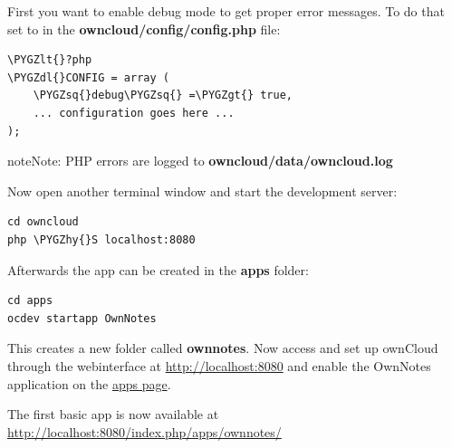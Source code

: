 \documentclass[letterpaper,10pt,english]{sphinxmanual}
\def\PYGZlt{\char`\<}
\def\PYGZgt{\char`\>}
\def\PYGZdl{\char`\$}
\def\PYGZhy{\char`\-}
\def\PYGZsq{\char`\'}
\renewcommand\PYGZsq{\textquotesingle}
\begin{document}
First you want to enable debug mode to get proper error messages. To do that set  to  in the \textbf{owncloud/config/config.php} file:

\begin{Verbatim}[commandchars=\\\{\}]
\PYGZlt{}?php
\PYGZdl{}CONFIG = array (
    \PYGZsq{}debug\PYGZsq{} =\PYGZgt{} true,
    ... configuration goes here ...
);
\end{Verbatim}

\begin{notice}{note}{Note:}
PHP errors are logged to \textbf{owncloud/data/owncloud.log}
\end{notice}

Now open another terminal window and start the development server:

\begin{Verbatim}[commandchars=\\\{\}]
cd owncloud
php \PYGZhy{}S localhost:8080
\end{Verbatim}

Afterwards the app can be created in the \textbf{apps} folder:

\begin{Verbatim}[commandchars=\\\{\}]
cd apps
ocdev startapp OwnNotes
\end{Verbatim}

This creates a new folder called \textbf{ownnotes}. Now access and set up ownCloud through the webinterface at \href{http://localhost:8080}{http://localhost:8080} and enable the OwnNotes application on the \href{http://localhost:8080/index.php/settings/apps}{apps page}.

The first basic app is now available at \href{http://localhost:8080/index.php/apps/ownnotes/}{http://localhost:8080/index.php/apps/ownnotes/}
\end{document}
